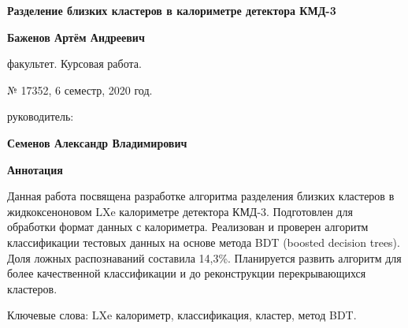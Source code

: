 \documentclass[14pt]{extarticle}
\begin{document}
	\setlength{\abovedisplayskip}{6pt}
	\setlength{\belowdisplayskip}{6pt}
	\setlength{\belowcaptionskip}{-15pt}
	\thispagestyle{fancy}
\begin{center}
    \textbf{Разделение близких кластеров в калориметре детектора КМД-3}
\end{center}

\noindent\textbf{Баженов Артём Андреевич}

 факультет. Курсовая работа.

 № 17352, 6 семестр, 2020 год.

 руководитель:

\noindent\textbf{Семенов Александр Владимирович}

\noindent\textbf{Аннотация}

Данная работа посвящена разработке алгоритма разделения близких кластеров в жидкоксеноновом LXe калориметре детектора КМД-3. Подготовлен для обработки формат данных с калориметра. Реализован и проверен алгоритм классификации тестовых данных на основе метода BDT (boosted decision trees). Доля ложных распознаваний составила 14,3\%. Планируется развить алгоритм для более качественной классификации и до реконструкции перекрывающихся кластеров.

Ключевые слова: LXe калориметр, классификация, кластер, метод BDT.
\end{document}

